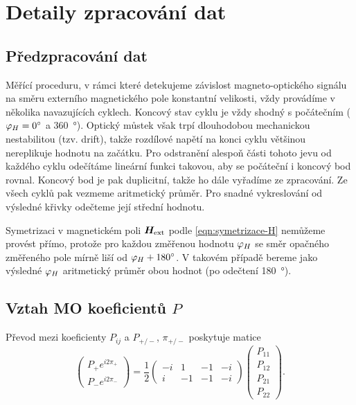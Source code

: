 \section{Detaily zpracování dat}
\label{app:zpracovani}

\subsection*{Předzpracování dat}

Měřící proceduru, v rámci které detekujeme závislost magneto-optického signálu na směru externího magnetického pole konstantní velikosti, vždy provádíme v několika navazujících cyklech.
Koncový stav cyklu je vždy shodný s počátečním ($\varphi_H=\SI{0}{\degree}$ a \SI{360}{\degree}).
Optický můstek však trpí dlouhodobou mechanickou nestabilitou (tzv. drift), takže rozdílové napětí na konci cyklu většinou nereplikuje hodnotu na začátku.
Pro odstranění alespoň části tohoto jevu od každého cyklu odečítáme lineární funkci takovou, aby se počáteční i koncový bod rovnal.
Koncový bod je pak duplicitní, takže ho dále vyřadíme ze zpracování.
Ze všech cyklů pak vezmeme aritmetický průměr.
Pro snadné vykreslování od výsledné křivky odečteme její střední hodnotu.

Symetrizaci v magnetickém poli $\bm{H}_\textrm{ext}$ podle \eqref{eqn:symetrizace-H} nemůžeme provést přímo, protože pro každou změřenou hodnotu $\varphi_H$ se směr opačného změřeného pole mírně liší od $\varphi_H+\SI{180}{\degree}$.
V takovém případě bereme jako výsledné $\varphi_H$ aritmetický průměr obou hodnot (po odečtení \SI{180}{\degree}).

\subsection*{Vztah MO koeficientů $P$}

Převod mezi koeficienty $P_{ij}$ a $P_{+/-}$, $\pi_{+/-}$ poskytuje matice
\begin{equation}
    \begin{pmatrix} P_+ e^{i2\pi_+} \\ P_- e^{i2\pi_-} \end{pmatrix}
    = \frac{1}{2}
    \begin{pmatrix} -i & 1 & -1 & -i \\ i & -1 & -1 & -i \end{pmatrix}
    \begin{pmatrix} P_{11}\\P_{12}\\P_{21}\\P_{22} \end{pmatrix}  .
\end{equation}


